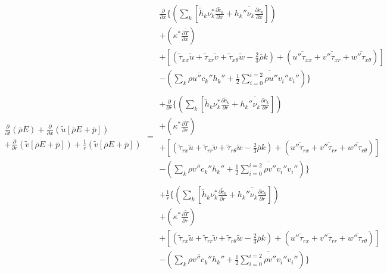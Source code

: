 \begin{displaymath}
	\begin{array}{c}
		\frac{\partial}{\partial t}(\overline{\rho}E) +
		\frac{\partial}{\partial x}(\tilde u[\overline{\rho}E + \overline{p}]) \\ +
		\frac{\partial}{\partial r}(\tilde v[\overline{\rho}E + \overline{p}]) +
		\frac{1}{r}(\tilde v[\overline{\rho}E + \overline{p}])
	\end{array} = 
	\begin{array}{c}
		\frac{\partial}{\partial x}\Big\{
		(\sum_{k}[\tilde h_k \nu_k^* \frac{\partial \tilde c_k}{\partial x} 
		+ \overline{h_k'' \nu_k \frac{\partial c_k}{\partial x}}]) 
		\\ +(\kappa^*\frac{\partial \tilde T}{\partial x}) \\ + [(\tilde \tau_{xx} \tilde u + 
		\tilde \tau_{xr} \tilde v + \tilde \tau_{x\theta} \tilde w -\frac{2}{3}\overline{\rho}k)
	 	+ (\overline{u''\tau_{xx}} + \overline{v''\tau_{xr}} + \overline{w''\tau_{x\theta}})] \\ 
		- (\overline{\sum_k \rho u'' c_k'' h_k''} 
		+ \frac{1}{2}\overline{\sum_{i=0}^{i=2} \rho u'' v_i'' v_i''}) \Big\} 
		\\ \\ + 
		\frac{\partial}{\partial r}\Big\{
		(\sum_{k}[\tilde h_k \nu_k^* \frac{\partial \tilde c_k}{\partial r} 
		+ \overline{h_k'' \nu_k \frac{\partial c_k}{\partial r}}]) 
		\\ +(\kappa^*\frac{\partial \tilde T}{\partial r}) \\ + [(\tilde \tau_{rx} \tilde u + 
		\tilde \tau_{rr} \tilde v + \tilde \tau_{r\theta} \tilde w -\frac{2}{3}\overline{\rho}k)
	 	+ (\overline{u''\tau_{rx}} + \overline{v''\tau_{rr}} + \overline{w''\tau_{r\theta}})] \\ 
		- (\overline{\sum_k \rho v'' c_k'' h_k''} 
		+ \frac{1}{2}\overline{\sum_{i=0}^{i=2} \rho v'' v_i'' v_i''}) \Big\} 
		\\ \\+ 
		\frac{1}{r}\Big\{
		(\sum_{k}[\tilde h_k \nu_k^* \frac{\partial \tilde c_k}{\partial r} 
		+ \overline{h_k'' \nu_k \frac{\partial c_k}{\partial r}}]) 
		\\ +(\kappa^*\frac{\partial \tilde T}{\partial r}) \\ + [(\tilde \tau_{rx} \tilde u + 
		\tilde \tau_{rr} \tilde v + \tilde \tau_{r\theta} \tilde w -\frac{2}{3}\overline{\rho}k)
	 	+ (\overline{u''\tau_{rx}} + \overline{v''\tau_{rr}} + \overline{w''\tau_{r\theta}})] \\ 
		- (\overline{\sum_k \rho v'' c_k'' h_k''} 
		+ \frac{1}{2}\overline{\sum_{i=0}^{i=2} \rho v'' v_i'' v_i''}) \Big\} 
	\end{array}
\end{displaymath}

